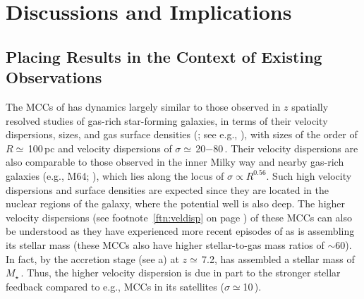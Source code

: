 \IfFileExists{emulateapjlegacy.cls}{\documentclass[iop]{emulateapjlegacy}}{\documentclass[iop]{emulateapj}}
\def\figpath{./Fig}
\begin{document}
%

\section{Discussions and Implications}\label{sec:diss}

\subsection{Placing Results in the Context of Existing Observations} \label{sec:diss1}

The MCCs of \flower has dynamics largely similar to those observed in $z$ spatially resolved studies of gas-rich star-forming galaxies, in terms of their velocity dispersions, sizes, and gas surface densities (; see e.g., \citealt{Swinbank11a}), with sizes of the order of $R\simeq$\,100\,pc and velocity dispersions of $\sigma\simeq$\,20$-$80\,\kms.
%
%
Their velocity dispersions are also comparable to those observed in the inner Milky way and nearby gas-rich galaxies (e.g., M64; \citealt{Oka01a, Rosolowsky05a, Heyer09a}), which lies along the locus of $\sigma\propto R^{0.56}$. Such high velocity dispersions and surface densities are expected since they are located in the nuclear regions of the galaxy, where the potential well is also deep. The higher velocity dispersions
(see footnote~\ref{ftn:veldisp} on page \pageref{ftn:veldisp}) of these MCCs can also be understood as they have experienced more recent episodes of \SF as \flower is assembling its stellar mass (these MCCs also have higher stellar-to-gas mass ratios of $\sim$60).
%
In fact, by the accretion stage (see a) at $z\simeq$\,7.2, 
\flower has assembled a stellar mass of $M_\star$\,\Msun. Thus, the higher velocity dispersion is due in part to the stronger stellar feedback compared to e.g., MCCs in its satellites ($\sigma\simeq$10\,\kms).
\end{document}
